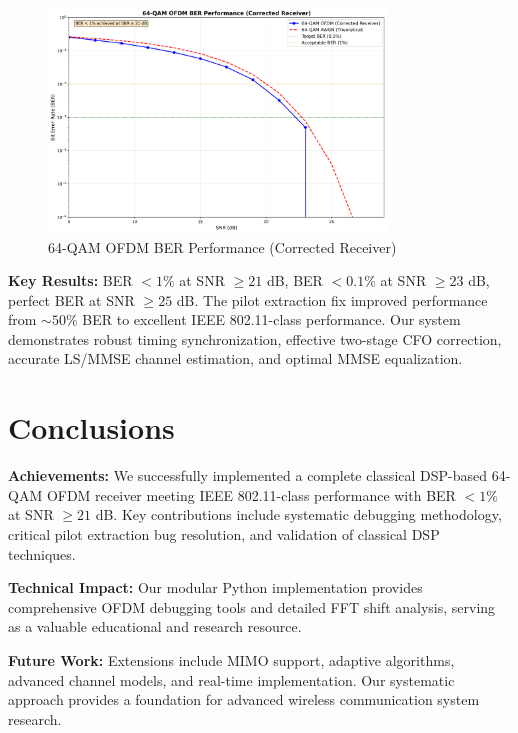 \documentclass[11pt,a4paper]{article}
\begin{document}
\begin{figure}[H]
    \centering
    \includegraphics[width=0.8\textwidth]{corrected_ber_curves.png}
    \caption{64-QAM OFDM BER Performance (Corrected Receiver)}
    \label{fig:ber_curves}
\end{figure}

\textbf{Key Results:} BER $< 1\%$ at SNR $\geq 21$ dB, BER $< 0.1\%$ at SNR $\geq 23$ dB, perfect BER at SNR $\geq 25$ dB. The pilot extraction fix improved performance from $\sim 50\%$ BER to excellent IEEE 802.11-class performance. Our system demonstrates robust timing synchronization, effective two-stage CFO correction, accurate LS/MMSE channel estimation, and optimal MMSE equalization.

\section{Conclusions}

\textbf{Achievements:} We successfully implemented a complete classical DSP-based 64-QAM OFDM receiver meeting IEEE 802.11-class performance with BER $< 1\%$ at SNR $\geq 21$ dB. Key contributions include systematic debugging methodology, critical pilot extraction bug resolution, and validation of classical DSP techniques.

\textbf{Technical Impact:} Our modular Python implementation provides comprehensive OFDM debugging tools and detailed FFT shift analysis, serving as a valuable educational and research resource.

\textbf{Future Work:} Extensions include MIMO support, adaptive algorithms, advanced channel models, and real-time implementation. Our systematic approach provides a foundation for advanced wireless communication system research.
\end{document}
